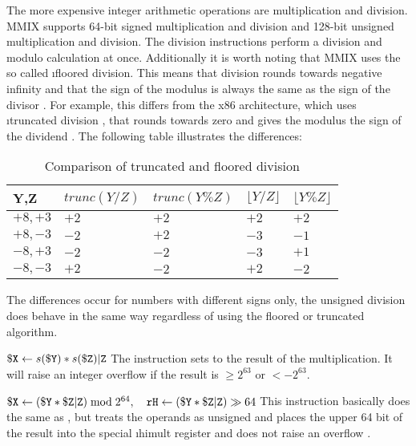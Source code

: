 The more expensive integer arithmetic operations are multiplication and division. MMIX supports 64-bit signed multiplication and division and 128-bit unsigned multiplication and division. The division instructions perform a division and modulo calculation at once. Additionally it is worth noting that MMIX uses the so called \i{floored division}. This means that division rounds towards negative infinity and that the sign of the modulus is always the same as the sign of the divisor \citep[pg. 2]{divmod}. For example, this differs from the x86 architecture, which uses \i{truncated division} \citep[pg. 560]{ia32-sdmv2a}, that rounds towards zero and gives the modulus the sign of the dividend \citep[pg. 2]{divmod}. The following table illustrates the differences:

\begin{table}[h]
	\begin{tabular}{| >{\centering}p{19mm} | >{\centering}p{26mm} | >{\centering}p{26mm} | >{\centering}p{26mm} | >{\centering}p{26mm} |}
		\hline
		\textbf{Y,Z} &
		\textbf{$trunc(Y / Z)$} & \textbf{$trunc(Y \% Z)$} &
		\textbf{$\lfloor Y / Z \rfloor$} & \textbf{$\lfloor Y \% Z \rfloor$}
		\tabularnewline
		\hline
		$+8,+3$ & $+2$ & $+2$ & $+2$ & $+2$
		\tabularnewline
		\hline
		$+8,-3$ & $-2$ & $+2$ & $-3$ & $-1$
		\tabularnewline
		\hline
		$-8,+3$ & $-2$ & $-2$ & $-3$ & $+1$
		\tabularnewline
		\hline
		$-8,-3$ & $+2$ & $-2$ & $+2$ & $-2$
		\tabularnewline
		\hline
	\end{tabular}
	\caption{Comparison of truncated and floored division \citep[pg. 3]{divmod}}
\end{table}
\noindent The differences occur for numbers with different signs only, \ie the unsigned division does behave in the same way regardless of using the floored or truncated algorithm.

\instrtbl
	{}
	{${\tt \$X} \leftarrow s({\tt \$Y}) * s({\tt \$Z}){\tt|Z}$}
\noindent The  instruction sets  to the result of the multiplication. It will raise an integer overflow  if the result is $\ge 2^{63}$ or $< -2^{63}$. \citep[pg. 14]{mmix-doc}

\instrtbl
	{}
	{${\tt \$X} \leftarrow ({\tt \$Y} * {\tt \$Z}{\tt|Z}) \bmod 2^{64},\quad
	{\tt rH} \leftarrow ({\tt \$Y} * {\tt \$Z}{\tt|Z}) \gg 64$}
\noindent This instruction basically does the same as , but treats the operands as unsigned and places the upper 64 bit of the result into the special \i{himult register}  and does not raise an overflow . \citep[pg. 14]{mmix-doc}

